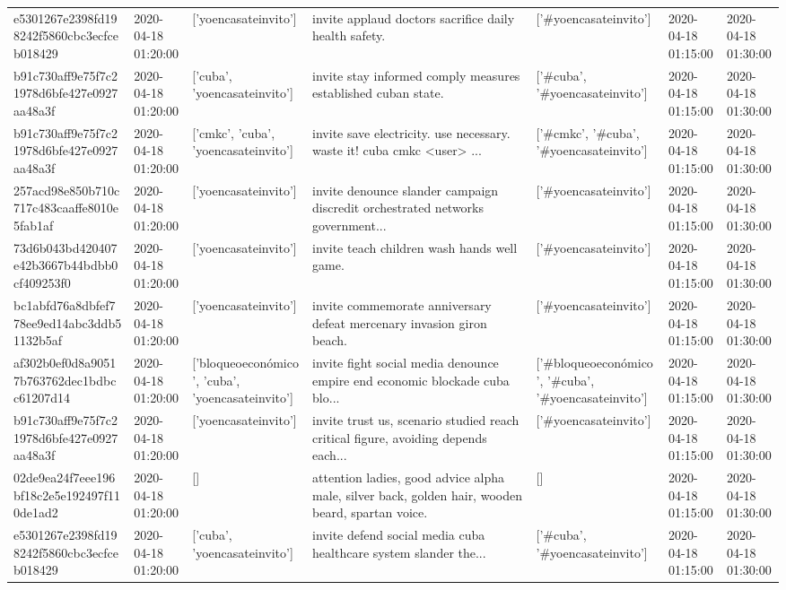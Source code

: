\begin{tabular}{lllllll}
e5301267e2398fd198242f5860cbc3ecfceb018429 & 2020-04-18 01:20:00 & ['yoencasateinvito'] & invite applaud doctors sacrifice daily health safety. & ['#yoencasateinvito'] & 2020-04-18 01:15:00 & 2020-04-18 01:30:00 \\
b91c730aff9e75f7c21978d6bfe427e0927aa48a3f & 2020-04-18 01:20:00 & ['cuba', 'yoencasateinvito'] & invite stay informed comply measures established cuban state. & ['#cuba', '#yoencasateinvito'] & 2020-04-18 01:15:00 & 2020-04-18 01:30:00 \\
b91c730aff9e75f7c21978d6bfe427e0927aa48a3f & 2020-04-18 01:20:00 & ['cmkc', 'cuba', 'yoencasateinvito'] & invite save electricity. use necessary. waste it! cuba cmkc <user> ... & ['#cmkc', '#cuba', '#yoencasateinvito'] & 2020-04-18 01:15:00 & 2020-04-18 01:30:00 \\
257acd98e850b710c717c483caaffe8010e5fab1af & 2020-04-18 01:20:00 & ['yoencasateinvito'] & invite denounce slander campaign discredit orchestrated networks government... & ['#yoencasateinvito'] & 2020-04-18 01:15:00 & 2020-04-18 01:30:00 \\
73d6b043bd420407e42b3667b44bdbb0cf409253f0 & 2020-04-18 01:20:00 & ['yoencasateinvito'] & invite teach children wash hands well game. & ['#yoencasateinvito'] & 2020-04-18 01:15:00 & 2020-04-18 01:30:00 \\
bc1abfd76a8dbfef778ee9ed14abc3ddb51132b5af & 2020-04-18 01:20:00 & ['yoencasateinvito'] & invite commemorate anniversary defeat mercenary invasion giron beach. & ['#yoencasateinvito'] & 2020-04-18 01:15:00 & 2020-04-18 01:30:00 \\
af302b0ef0d8a90517b763762dec1bdbcc61207d14 & 2020-04-18 01:20:00 & ['bloqueoeconómico', 'cuba', 'yoencasateinvito'] & invite fight social media denounce empire end economic blockade cuba blo... & ['#bloqueoeconómico', '#cuba', '#yoencasateinvito'] & 2020-04-18 01:15:00 & 2020-04-18 01:30:00 \\
b91c730aff9e75f7c21978d6bfe427e0927aa48a3f & 2020-04-18 01:20:00 & ['yoencasateinvito'] & invite trust us, scenario studied reach critical figure, avoiding depends each... & ['#yoencasateinvito'] & 2020-04-18 01:15:00 & 2020-04-18 01:30:00 \\
02de9ea24f7eee196bf18c2e5e192497f110de1ad2 & 2020-04-18 01:20:00 & [] & attention ladies, good advice alpha male, silver back, golden hair, wooden beard, spartan voice. & [] & 2020-04-18 01:15:00 & 2020-04-18 01:30:00 \\
e5301267e2398fd198242f5860cbc3ecfceb018429 & 2020-04-18 01:20:00 & ['cuba', 'yoencasateinvito'] & invite defend social media cuba healthcare system slander the... & ['#cuba', '#yoencasateinvito'] & 2020-04-18 01:15:00 & 2020-04-18 01:30:00 \\

\end{tabular}
